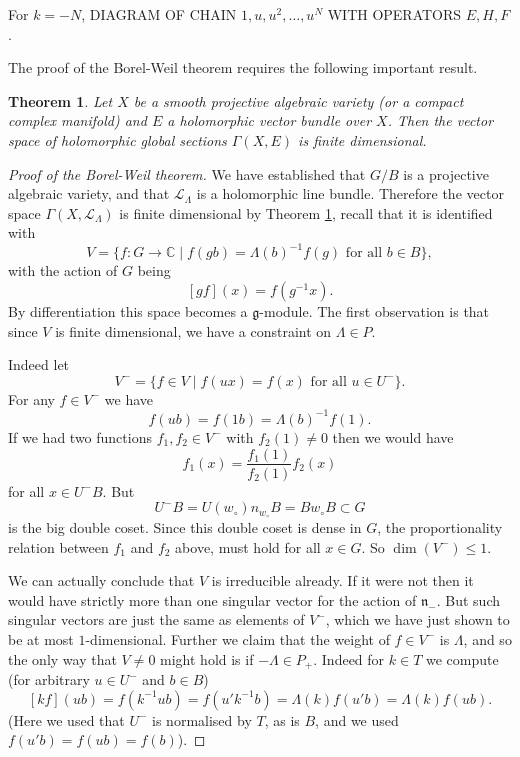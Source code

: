 \documentclass[12pt]{article}
\theoremstyle{plain}
\newtheorem{thm}{Theorem}[section]
\theoremstyle{definition}
\numberwithin{equation}{section}
\newcommand{\La}{\Lambda}
\newcommand{\C}{\mathbb{C}}
\newcommand{\g}{\mathfrak{g}}
\newcommand{\n}{\mathfrak{n}}
\newcommand{\CL}{\mathcal{L}}
\begin{document}
{\color{blue}For $k = -N$, DIAGRAM OF CHAIN $1, u, u^2, \ldots, u^{N}$ WITH OPERATORS $E, H, F$.}




The proof of the Borel-Weil theorem requires the following important result.
\begin{thm}\label{thm:finiteness.sections}
Let $X$ be a smooth projective algebraic variety (or a compact complex manifold) and $E$ a holomorphic vector bundle over $X$. Then the vector space of holomorphic global sections $\Gamma(X, E)$ is finite dimensional.
\end{thm}




\begin{proof}[Proof of the Borel-Weil theorem]
We have established that $G/B$ is a projective algebraic variety, and that $\CL_\Lambda$ is a holomorphic line bundle. Therefore the vector space $\Gamma(X, \CL_\La)$ is finite dimensional by Theorem \ref{thm:finiteness.sections}, recall that it is identified with
\[
V = \{f : G \rightarrow \C \mid \text{$f(gb) = \Lambda(b)^{-1} f(g)$ for all $b \in B$}\},
\]
with the action of $G$ being
\[
[gf](x) = f(g^{-1}x).
\]
By differentiation this space becomes a $\g$-module. The first observation is that since $V$ is finite dimensional, we have a constraint on $\Lambda \in P$.

Indeed let
\[
V^- = \{f \in V \mid \text{$f(ux) = f(x)$ for all $u \in U^-$}\}.
\]
For any $f \in V^-$ we have
\[
f(ub) = f(1b) = \Lambda(b)^{-1}f(1).
\]
If we had two functions $f_1, f_2 \in V^-$ with $f_2(1) \neq 0$ then we would have
\[
f_1(x) = \frac{f_1(1)}{f_2(1)} f_2(x)
\]
for all $x \in U^-B$. But
\[
U^-B = U(w_\circ) n_{w_\circ} B = B w_\circ B \subset G
\]
is the big double coset. Since this double coset is dense in $G$, the proportionality relation between $f_1$ and $f_2$ above, must hold for all $x \in G$.  So $\dim(V^-) \leq 1$.


We can actually conclude that $V$ is irreducible already. If it were not then it would have strictly more than one singular vector for the action of $\n_-$. But such singular vectors are just the same as elements of $V^-$, which we have just shown to be at most $1$-dimensional. Further we claim that the weight of $f \in V^-$ is $\La$, and so the only way that $V \neq 0$ might hold is if $-\La \in P_+$. Indeed for $k \in T$ we compute (for arbitrary $u \in U^-$ and $b \in B$)
\[
[kf](u b) = f(k^{-1}ub) = f(u' k^{-1} b) = \Lambda(k) f(u' b) = \Lambda(k) f(u b).
\]
(Here we used that $U^-$ is normalised by $T$, as is $B$, and we used $f(u'b) = f(ub) = f(b)$).



\end{proof}
\end{document}
